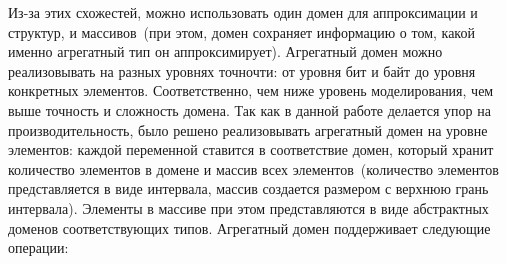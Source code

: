 Из-за этих схожестей, можно использовать один домен для аппроксимации и 
структур, и массивов~(при этом, домен сохраняет информацию о том, какой именно
агрегатный тип он аппроксимирует). Агрегатный домен можно реализовывать на 
разных уровнях точночти: от уровня бит и байт до уровня конкретных элементов. 
Соответственно, чем ниже уровень моделирования, чем выше точность и сложность 
домена. Так как в данной работе делается упор на производительность, было 
решено реализовывать агрегатный домен на уровне элементов: каждой переменной 
ставится в соответствие домен, который хранит количество элементов в домене и 
массив всех элементов~(количество элементов представляется в виде интервала, 
массив создается размером с верхнюю грань интервала). Элементы в массиве при 
этом представляются в виде абстрактных доменов соответствующих типов. 
Агрегатный домен поддерживает следующие операции:
